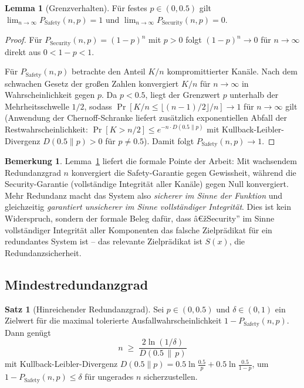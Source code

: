 ﻿\documentclass[a4paper,12pt]{article}
\theoremstyle{definition}
\newtheorem{satz}{Satz}
\newtheorem{lemma}{Lemma}
\newtheorem{bemerkung}{Bemerkung}
\begin{document}
\begin{lemma}[Grenzverhalten]
	\label{lem:grenzwert}
	Für festes $p \in (0,0.5)$ gilt $\lim_{n\to\infty} P_{\mathrm{Safety}}(n,p) = 1$ und $\lim_{n\to\infty} P_{\mathrm{Security}}(n,p) = 0$.
\end{lemma}

\begin{proof}
	Für $P_{\mathrm{Security}}(n,p) = (1-p)^n$ mit $p>0$ folgt $(1-p)^n \to 0$ für $n \to \infty$ direkt aus $0 < 1-p < 1$.

	Für $P_{\mathrm{Safety}}(n,p)$ betrachte den Anteil $K/n$ kompromittierter Kanäle. Nach dem schwachen Gesetz der großen Zahlen konvergiert $K/n$ für $n\to\infty$ in Wahrscheinlichkeit gegen $p$. Da $p < 0.5$, liegt der Grenzwert $p$ unterhalb der Mehrheitsschwelle $1/2$, sodass $\Pr[K/n \leq \lfloor (n-1)/2\rfloor/n] \to 1$ für $n \to \infty$ gilt (Anwendung der Chernoff-Schranke liefert zusätzlich exponentiellen Abfall der Restwahrscheinlichkeit: $\Pr[K > n/2] \leq e^{-n \cdot D(0.5 \| p)}$ mit Kullback-Leibler-Divergenz $D(0.5\|p) > 0$ für $p \neq 0.5$). Damit folgt $P_{\mathrm{Safety}}(n,p) \to 1$. \qedhere
\end{proof}

\begin{bemerkung}
	Lemma~\ref{lem:grenzwert} liefert die formale Pointe der Arbeit: Mit wachsendem Redundanzgrad $n$ konvergiert die Safety-Garantie gegen Gewissheit, während die Security-Garantie (vollständige Integrität aller Kanäle) gegen Null konvergiert. Mehr Redundanz macht das System also \emph{sicherer im Sinne der Funktion} und gleichzeitig \emph{garantiert unsicherer im Sinne vollständiger Integrität}. Dies ist kein Widerspruch, sondern der formale Beleg dafür, dass â€žSecurity'' im Sinne vollständiger Integrität aller Komponenten das falsche Zielprädikat für ein redundantes System ist -- das relevante Zielprädikat ist $S(x)$, die Redundanzsicherheit.
\end{bemerkung}

\subsection{Mindestredundanzgrad}

\begin{satz}[Hinreichender Redundanzgrad]
	\label{satz:minimalradundanz}
	Sei $p \in (0,0.5)$ und $\delta \in (0,1)$ ein Zielwert für die maximal tolerierte Ausfallwahrscheinlichkeit $1 - P_{\mathrm{Safety}}(n,p)$. Dann genügt
	\[
	n \;\geq\; \frac{2\ln(1/\delta)}{D(0.5\,\|\,p)}
	\]
	mit Kullback-Leibler-Divergenz $D(0.5\|p) = 0.5\ln\frac{0.5}{p} + 0.5\ln\frac{0.5}{1-p}$, um $1 - P_{\mathrm{Safety}}(n,p) \leq \delta$ für ungerades $n$ sicherzustellen.
\end{satz}
\end{document}
